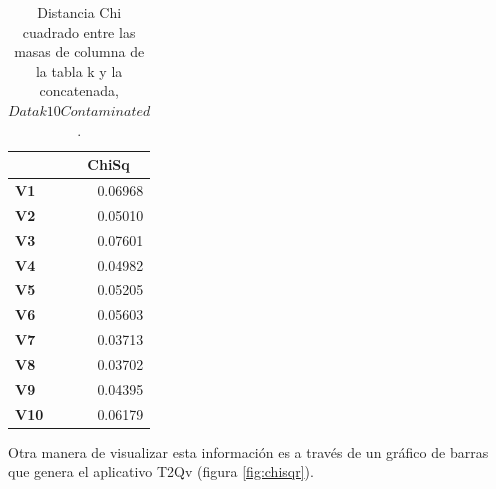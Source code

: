 \documentclass[mathematics,article,submit,moreauthors,pdftex]{mdpi}
\begin{document}
\begin{table}[H]
\centering
\begin{tabular}{lr}
\toprule
\multicolumn{1}{c}{\cellcolor[HTML]{FFFFFF}{\color[HTML]{000000} \textbf{Variables}}} & \multicolumn{1}{c}{\textbf{ChiSq}} \\ \midrule

\textbf{V1}                                                                             & {\color[HTML]{333333} 0.06968}      \\ 
\textbf{V2}                                                                       & {\color[HTML]{333333} 0.05010}      \\ 
\textbf{V3}                                                                       & {\color[HTML]{333333} 0.07601}      \\ 
\textbf{V4}                                                                       & {\color[HTML]{333333} 0.04982}      \\ 
\textbf{V5}                                                                       & {\color[HTML]{333333} 0.05205}      \\ 
\textbf{V6}                                                                       & {\color[HTML]{333333} 0.05603}      \\ 
\textbf{V7}                                                                       & {\color[HTML]{333333} 0.03713}      \\ 
\textbf{V8}                                                                       & {\color[HTML]{333333} 0.03702}      \\ 
\textbf{V9}                                                                       & {\color[HTML]{333333} 0.04395}      \\ 
\textbf{V10}                                                                            & {\color[HTML]{333333} 0.06179}      \\ \hline
\end{tabular}
\caption{Distancia Chi cuadrado entre las masas de columna de la tabla k y la concatenada, $Datak10Contaminated$.}

\label{tab:chiexamp}
\end{table}

Otra manera de visualizar esta información es a través de un gráfico de
barras que genera el aplicativo T2Qv (figura \ref{fig:chisqr}).
\end{document}
